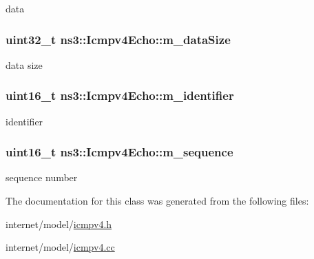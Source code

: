 data 

\subsubsection[{\texorpdfstring{m\+\_\+data\+Size}{m_dataSize}}]{\setlength{\rightskip}{0pt plus 5cm}uint32\+\_\+t ns3\+::\+Icmpv4\+Echo\+::m\+\_\+data\+Size\hspace{0.3cm}{\ttfamily [private]}}\hypertarget{classns3_1_1Icmpv4Echo_ae30320e397223dbcb7d2c4cc63b28f39}{}\label{classns3_1_1Icmpv4Echo_ae30320e397223dbcb7d2c4cc63b28f39}


data size 

\subsubsection[{\texorpdfstring{m\+\_\+identifier}{m_identifier}}]{\setlength{\rightskip}{0pt plus 5cm}uint16\+\_\+t ns3\+::\+Icmpv4\+Echo\+::m\+\_\+identifier\hspace{0.3cm}{\ttfamily [private]}}\hypertarget{classns3_1_1Icmpv4Echo_a37f842b9ee0d405e76c84af9f40e25f0}{}\label{classns3_1_1Icmpv4Echo_a37f842b9ee0d405e76c84af9f40e25f0}


identifier 

\subsubsection[{\texorpdfstring{m\+\_\+sequence}{m_sequence}}]{\setlength{\rightskip}{0pt plus 5cm}uint16\+\_\+t ns3\+::\+Icmpv4\+Echo\+::m\+\_\+sequence\hspace{0.3cm}{\ttfamily [private]}}\hypertarget{classns3_1_1Icmpv4Echo_a37fbd206b8858257b870c381a206da06}{}\label{classns3_1_1Icmpv4Echo_a37fbd206b8858257b870c381a206da06}


sequence number 



The documentation for this class was generated from the following files\+:\begin{DoxyCompactItemize}
\item 
internet/model/\hyperlink{icmpv4_8h}{icmpv4.\+h}\item 
internet/model/\hyperlink{icmpv4_8cc}{icmpv4.\+cc}\end{DoxyCompactItemize}
